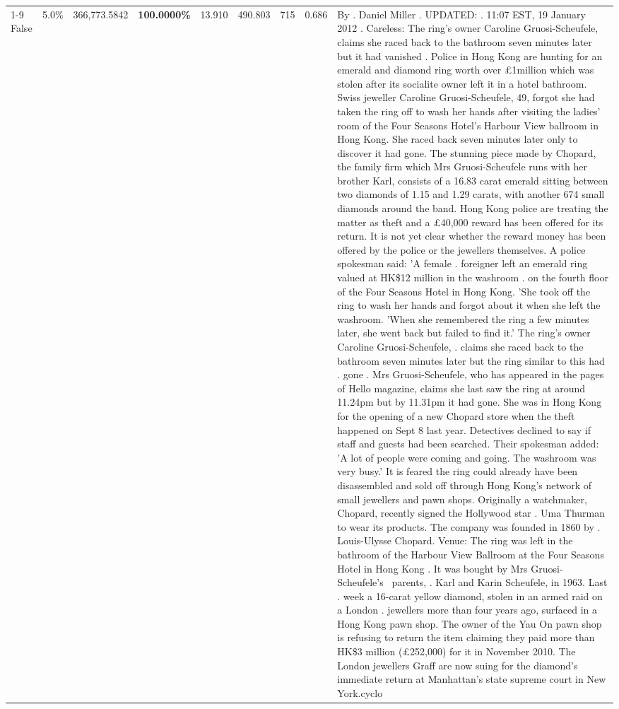 \begin{table}[H]
\begin{tabular}{lllrlllll}
\cline{1-9}
False & 5.0\% & 366,773.5842 & \bfseries \color{red} 100.0000\% & 13.910 & 490.803 & 715 & 0.686 & By . Daniel Miller . UPDATED: . 11:07 EST, 19 January 2012 . Careless: The ring's owner Caroline Gruosi-Scheufele, claims she raced back to the bathroom seven minutes later but it had vanished . Police in Hong Kong are hunting for an emerald and diamond ring worth over £1million which was stolen after its socialite owner left it in a hotel bathroom. Swiss jeweller Caroline Gruosi-Scheufele, 49, forgot she had taken the ring off to wash her hands after visiting the ladies' room of the Four Seasons Hotel's Harbour View ballroom in Hong Kong. She raced back seven minutes later only to discover it had gone. The stunning piece made by Chopard, the family firm which Mrs Gruosi-Scheufele runs with her brother Karl, consists of a 16.83 carat emerald sitting between two diamonds of 1.15 and 1.29 carats, with another 674 small diamonds around the band. Hong Kong police are treating the matter as theft and a £40,000 reward has been offered for its return. It is not yet clear whether the reward money has been offered by the police or the jewellers themselves. A police spokesman said: 'A female . foreigner left an emerald ring valued at HK\$12 million in the washroom . on the fourth floor of the Four Seasons Hotel in Hong Kong. 'She took off the ring to wash her hands and forgot about it when she left the washroom. 'When she remembered the ring a few minutes later, she went back but failed to find it.' The ring's owner Caroline Gruosi-Scheufele, . claims she raced back to the bathroom seven minutes later but the ring similar to this had . gone . Mrs Gruosi-Scheufele, who has appeared in the pages of Hello magazine, claims she last saw the ring at around 11.24pm but by 11.31pm it had gone. She was in Hong Kong for the opening of a new Chopard store when the theft happened on Sept 8 last year. Detectives declined to say if staff and guests had been searched. Their spokesman added: 'A lot of people were coming and going. The washroom was very busy.' It is feared the ring could already have been disassembled and sold off through Hong Kong's network of small jewellers and pawn shops. Originally a watchmaker, Chopard, recently signed the Hollywood star . Uma Thurman to wear its products. The company was founded in 1860 by . Louis-Ulysse Chopard. Venue: The ring was left in the bathroom of the Harbour View Ballroom at the Four Seasons Hotel in Hong Kong . It was bought by Mrs Gruosi-Scheufele's  parents, . Karl and Karin Scheufele, in 1963. Last . week a 16-carat yellow diamond, stolen in an armed raid on a London . jewellers more than four years ago, surfaced in a Hong Kong pawn shop. The owner of the Yau On pawn shop is refusing to return the item claiming they paid more than HK\$3 million (£252,000) for it in November 2010. The London jewellers Graff are now suing for the diamond’s immediate return at Manhattan’s state supreme court in New York.cyclo \\

\end{tabular}
\end{table}
